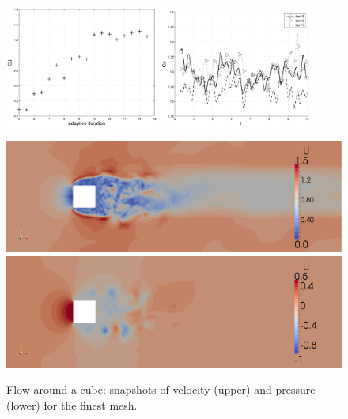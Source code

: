 \begin{figure}
          {\includegraphics[width=0.45\textwidth]{chapters/hoffman-1/png/fig1a.png}
           \includegraphics[width=0.45\textwidth]{chapters/hoffman-1/png/fig1b.png}}
\end{figure}

\begin{figure}
  \center
  \includegraphics[width=\largefig]{chapters/hoffman-1/png/fig2b.png}
  \medskip
  \includegraphics[width=\largefig]{chapters/hoffman-1/png/fig2c.png}
  \caption{Flow around a cube: snapshots of velocity (upper) and pressure
    (lower) for the finest mesh.}
  \label{hoffman-1:fig:cube2}
\end{figure}

